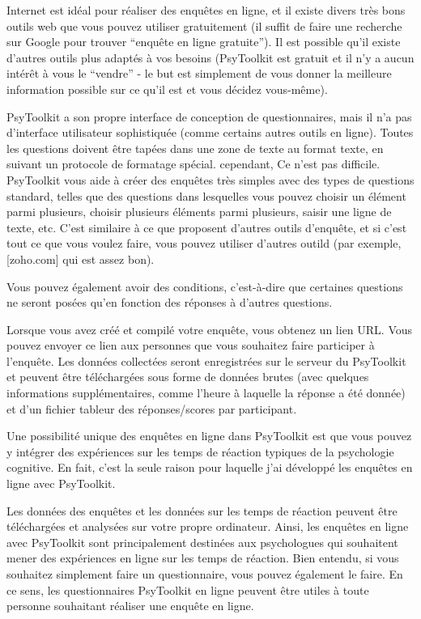 \documentclass[
]{book}
\begin{document}
Internet est idéal pour réaliser des enquêtes en ligne, et il existe divers très bons outils web que vous pouvez utiliser gratuitement (il suffit de faire une recherche sur Google pour trouver ``enquête en ligne gratuite''). Il est possible qu'il existe d'autres outils plus adaptés à vos besoins (PsyToolkit est gratuit et il n'y a aucun intérêt à vous le ``vendre'' - le but est simplement de vous donner la meilleure information possible sur ce qu'il est et vous décidez vous-même).

PsyToolkit a son propre interface de conception de questionnaires, mais il n'a pas d'interface utilisateur sophistiquée (comme certains autres outils en ligne). Toutes les questions doivent être tapées dans une zone de texte au format texte, en suivant un protocole de formatage spécial. cependant, Ce n'est pas difficile.
PsyToolkit vous aide à créer des enquêtes très simples avec des types de questions standard, telles que des questions dans lesquelles vous pouvez choisir un élément parmi plusieurs, choisir plusieurs éléments parmi plusieurs, saisir une ligne de texte, etc. C'est similaire à ce que proposent d'autres outils d'enquête, et si c'est tout ce que vous voulez faire, vous pouvez utiliser d'autres outild (par exemple, {[}zoho.com{]} qui est assez bon).

Vous pouvez également avoir des conditions, c'est-à-dire que certaines questions ne seront posées qu'en fonction des réponses à d'autres questions.

Lorsque vous avez créé et compilé votre enquête, vous obtenez un lien URL. Vous pouvez envoyer ce lien aux personnes que vous souhaitez faire participer à l'enquête. Les données collectées seront enregistrées sur le serveur du PsyToolkit et peuvent être téléchargées sous forme de données brutes (avec quelques informations supplémentaires, comme l'heure à laquelle la réponse a été donnée) et d'un fichier tableur des réponses/scores par participant.

Une possibilité unique des enquêtes en ligne dans PsyToolkit est que vous pouvez y intégrer des expériences sur les temps de réaction typiques de la psychologie cognitive. En fait, c'est la seule raison pour laquelle j'ai développé les enquêtes en ligne avec PsyToolkit.

Les données des enquêtes et les données sur les temps de réaction peuvent être téléchargées et analysées sur votre propre ordinateur. Ainsi, les enquêtes en ligne avec PsyToolkit sont principalement destinées aux psychologues qui souhaitent mener des expériences en ligne sur les temps de réaction. Bien entendu, si vous souhaitez simplement faire un questionnaire, vous pouvez également le faire. En ce sens, les questionnaires PsyToolkit en ligne peuvent être utiles à toute personne souhaitant réaliser une enquête en ligne.
\end{document}
